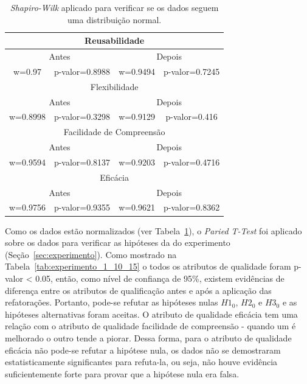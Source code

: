\begin{table}[h]
\centering
\caption{\textit{Shapiro-Wilk} aplicado para verificar se os dados seguem uma distribuição normal.}
\label{tab:shapiro_experimento_1}
\begin{tabular}{|c|c|c|c|}
\hline
\multicolumn{4}{|c|}{Reusabilidade}                       \\ \hline
\multicolumn{2}{|c|}{Antes} & \multicolumn{2}{c|}{Depois} \\ \hline
w=0.97        & p-valor=0.8988        & w=0.9494        & p-valor=0.7245        \\ \hline
\multicolumn{4}{|c|}{Flexibilidade}                       \\ \hline
\multicolumn{2}{|c|}{Antes} & \multicolumn{2}{c|}{Depois} \\ \hline
w=0.8998        & p-valor=0.3298        & w=0.9129        & p-valor=0.416        \\ \hline
\multicolumn{4}{|c|}{Facilidade de Compreensão}           \\ \hline
\multicolumn{2}{|c|}{Antes} & \multicolumn{2}{c|}{Depois} \\ \hline
w=0.9594        & p-valor=0.8137        & w=0.9203        & p-valor=0.4716         \\ \hline
\multicolumn{4}{|c|}{Eficácia}                            \\ \hline
\multicolumn{2}{|c|}{Antes} & \multicolumn{2}{c|}{Depois} \\ \hline
w=0.9756        & p-valor=0.9355         & w=0.9621        & p-valor=0.8362        \\ \hline
\end{tabular}
\end{table}

Como os dados estão normalizados (ver Tabela~\ref{tab:shapiro_experimento_1}), o \textit{Paried T-Test} foi aplicado sobre os dados para verificar as hipóteses da  do experimento (Seção~\ref{sec:experimento}). Como mostrado na Tabela~\ref{tab:experimento_1_10_15} o todos os atributos de qualidade foram p-valor < 0.05, então, como nível de confiança de 95\%, existem evidências de diferença entre os atributos de qualificação antes e após a aplicação das refatorações. Portanto, pode-se refutar as hipóteses nulas \textbf{$H1_{0}$}, \textbf{$H2_{0}$} e \textbf{$H3_{0}$} e as hipóteses alternativas foram aceitas. O atributo de qualidade eficácia tem uma relação com o atributo de qualidade facilidade de compreensão - quando um é melhorado o outro tende a piorar. Dessa forma, para o atributo de qualidade eficácia não pode-se refutar a hipótese nula, os dados não se demostraram estatisticamente significantes para refuta-la, ou seja, não houve evidência suficientemente forte para provar que a hipótese nula era falsa.


